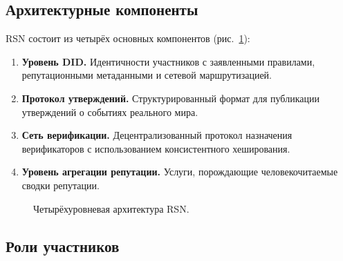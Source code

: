 \documentclass[11pt,a4paper,twocolumn]{article}
\begin{document}
\subsection{Архитектурные компоненты}

RSN состоит из четырёх основных компонентов (рис.~\ref{fig:architecture}):
\begin{enumerate}[nosep]
\item \textbf{Уровень DID.} Идентичности участников с заявленными правилами, репутационными метаданными и сетевой маршрутизацией.
\item \textbf{Протокол утверждений.} Структурированный формат для публикации утверждений о событиях реального мира.
\item \textbf{Сеть верификации.} Децентрализованный протокол назначения верификаторов с использованием консистентного хеширования.
\item \textbf{Уровень агрегации репутации.} Услуги, порождающие человекочитаемые сводки репутации.
\end{enumerate}

\begin{figure}[ht]
\centering
{}
\caption{Четырёхуровневая архитектура RSN.}
\label{fig:architecture}
\end{figure}

\subsection{Роли участников}
\end{document}
